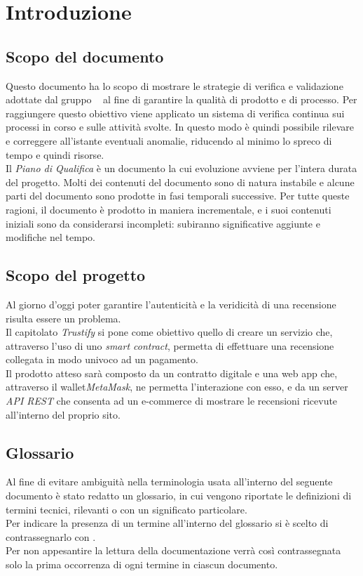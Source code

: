 \section{Introduzione}


\subsection{Scopo del documento}
Questo documento ha lo scopo di mostrare le strategie di verifica e validazione adottate dal gruppo \groupName ~ al fine di garantire la qualità di prodotto e di processo. Per raggiungere questo obiettivo viene applicato un sistema di verifica continua sui processi in corso e sulle attività svolte. In questo modo è quindi possibile rilevare e correggere all'istante eventuali anomalie, riducendo al minimo lo spreco di tempo e quindi risorse.\\
Il \textit{Piano di Qualifica} è un documento la cui evoluzione avviene per l'intera durata del progetto. Molti dei contenuti del documento sono di natura instabile e alcune parti del documento sono prodotte in fasi temporali successive. Per tutte queste ragioni, il documento è prodotto in maniera incrementale, e i suoi contenuti iniziali sono da considerarsi incompleti: subiranno significative aggiunte e modifiche nel tempo.




\subsection{Scopo del progetto}

Al giorno d'oggi poter garantire l'autenticità e la veridicità di una
recensione\glo \: risulta essere un problema. \\ Il capitolato \textit{Trustify} si
pone come obiettivo quello di creare un servizio che, attraverso l'uso di uno
\textit{smart contract}\glo \:, permetta di effettuare una recensione collegata in
modo univoco ad un pagamento. \\ Il prodotto atteso sarà composto da un
contratto digitale e una web app che, attraverso il wallet\glo  \textit{MetaMask}\glo \:, ne
permetta l'interazione con esso, e da un server \textit{API REST}\glo \: che consenta ad un
e-commerce\glo \: di mostrare le recensioni ricevute all'interno del proprio sito.

\subsection{Glossario}
Al fine di evitare ambiguità nella terminologia usata all'interno del seguente
documento è stato redatto un glossario, in cui vengono riportate le definizioni
di termini tecnici, rilevanti o con un significato particolare. \\ Per indicare
la presenza di un termine all'interno del glossario si è scelto di
contrassegnarlo con \glo .\\ Per non appesantire la lettura della documentazione
verrà così contrassegnata solo la prima occorrenza di ogni termine in ciascun
documento.

